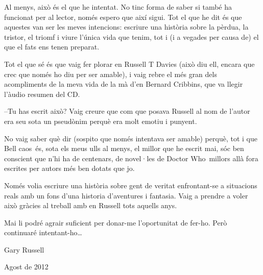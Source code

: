 Al menys, això és el que he intentat. No tinc forma de saber si també ha
funcionat per al lector, només espero que així sigui. Tot el que he dit
és que aquestes van ser les meves intencions: escriure una història
sobre la pèrdua, la tristor, el triomf i viure l'única vida que tenim,
tot i (i a vegades per causa de) el que el fats ens tenen preparat.

Tot el que sé és que vaig fer plorar en Russell T Davies (això diu ell,
encara que crec que només ho diu per ser amable), i vaig rebre el més
gran dels acompliments de la meva vida de la mà d'en Bernard Cribbins,
que va llegir l'àudio resumen del CD.

--Tu has escrit això? Vaig creure que com que posava Russell al nom de
l'autor era seu sota un pseudònim perquè era molt emotiu i punyent.

No vaig saber què dir (sospito que només intentava ser amable) perquè,
tot i que Bell caos~és, sota els meus ulls al menys, el millor que he
escrit mai, sóc ben conscient que n'hi ha de centenars, de novel·les de
Doctor Who~millors allà fora escrites per autors més ben dotats que jo.

Només volia escriure una història sobre gent de veritat enfrontant-se a
situacions reals amb un fons d'una historia d'aventures i fantasia. Vaig
a prendre a voler això gràcies al treball amb en Russell tots aquells
anys.

Mai li podré agrair suficient per donar-me l'oportunitat de fer-ho. Però
continuaré intentant-ho\ldots{}

Gary Russell

Agost de 2012
